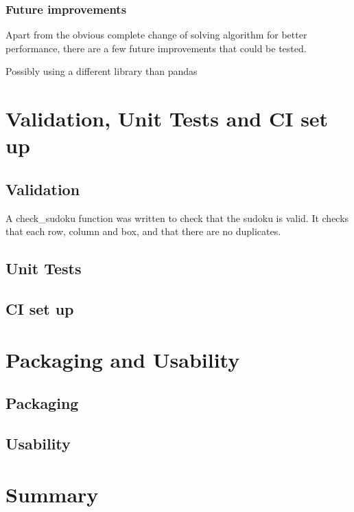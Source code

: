 \documentclass[12pt]{report} %
\begin{document}
\subsection*{Future improvements}

Apart from the obvious complete change of solving algorithm for better performance, there are a few future improvements that could be tested. 

Possibly using a different library than pandas\cite{no_copy_dataframe}


\chapter{Validation, Unit Tests and CI set up}

\section{Validation}

A check\_sudoku function was written to check that the sudoku is valid. It checks that each row, column and box, and that there are no duplicates.

\section{Unit Tests}

\section{CI set up}

\chapter{Packaging and Usability}

\section{Packaging}

\section{Usability}


\chapter{Summary}



\end{document}
